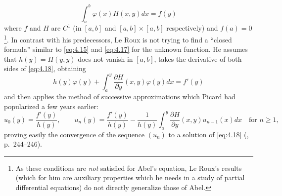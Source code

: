 \documentclass[12pt,a4paper,leqno,twoside]{extbook}
\newcommand{\pder}[2]{\frac{\partial #1}{\partial #2}}
\begin{document}
\begin{equation}
    \label{eq:4.18}
    \int_a^b \varphi(x) H(x, y)dx = f(y)
\end{equation}
where \(f\) and \(H\) are \(C^1\) (in \([a,b]\) and \([a,b] \times [a,b]\) respectively) and \(f(a) = 0\) \footnote{As these conditions are \emph{not} satisfied for Abel's equation, Le Roux's results (which for him are auxiliary properties which he needs in a study of partial differential equations) do not directly generalize those of Abel.}. In contrast with his predecessors, Le Roux is not trying to find a ``closed formula'' similar to \eqref{eq:4.15} and \eqref{eq:4.17} for the unknown function. He assumes that \(h(y) = H(y,y)\) does not vanish in \([a,b]\), takes the derivative of both sides of \eqref{eq:4.18}, obtaining
\begin{equation}
    \label{eq:4.19}
    h(y) \varphi(y) + \int_a^y \pder{H}{y}(x, y) \varphi(y) dx = f'(y)
\end{equation}
and then applies the method of successive approximations which Picard had popularized a few years earlier:
\[
    u_0(y) = \frac{f'(y)}{h(y)}, \qquad u_n(y) = \frac{f'(y)}{h(y)} - \frac{1}{h(y)} \int_a^y \pder{H}{y}(x, y) u_{n-1}(x)dx \quad \text{for } n \geq 1,
\]
proving easily the convergence of the sequence \((u_n)\) to a solution of \eqref{eq:4.18} (\cite{143}, p.~244--246).
\end{document}
